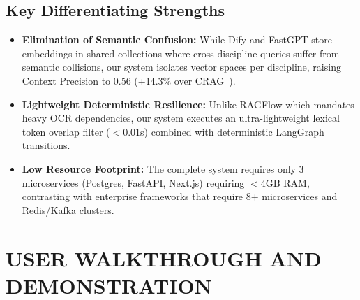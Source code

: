 \documentclass[conference]{IEEEtran}
\begin{document}
\subsection{Key Differentiating Strengths}
\begin{itemize}
    \item \textbf{Elimination of Semantic Confusion:} While Dify and FastGPT store embeddings in shared collections where cross-discipline queries suffer from semantic collisions, our system isolates vector spaces per discipline, raising Context Precision to 0.56 (+14.3\% over CRAG~\cite{yan2024corrective}).
    \item \textbf{Lightweight Deterministic Resilience:} Unlike RAGFlow which mandates heavy OCR dependencies, our system executes an ultra-lightweight lexical token overlap filter ($< 0.01$s) combined with deterministic LangGraph transitions.
    \item \textbf{Low Resource Footprint:} The complete system requires only 3 microservices (Postgres, FastAPI, Next.js) requiring $< 4\text{GB}$ RAM, contrasting with enterprise frameworks that require 8+ microservices and Redis/Kafka clusters.
\end{itemize}

\section{USER WALKTHROUGH AND DEMONSTRATION}
\end{document}
